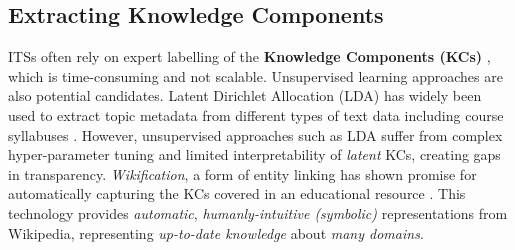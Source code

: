 \documentclass[letterpaper]{article} %
\begin{document}
\subsection{Extracting Knowledge Components}

ITSs often rely on expert labelling of the \textbf{Knowledge Components (KCs)} \cite{assistments_data}
, which is time-consuming and not scalable. Unsupervised learning approaches
are also potential candidates.
{Latent Dirichlet Allocation (LDA) has widely been used to extract topic metadata from different types of text data including course syllabuses \cite{Apaza2014OnlineCR}. However, unsupervised approaches such as LDA suffer from complex hyper-parameter tuning \cite{PANICHELLA2021106411}} and limited interpretability of \emph{latent} KCs, creating gaps in transparency. %
\emph{Wikification}, a form of entity linking \cite{wikifier}
has shown promise for automatically capturing the KCs covered in an educational resource \cite{truelearn}. This technology provides \emph{automatic}, \emph{humanly-intuitive (symbolic)} representations from Wikipedia, representing \emph{up-to-date knowledge} about \emph{many domains}.
\end{document}
